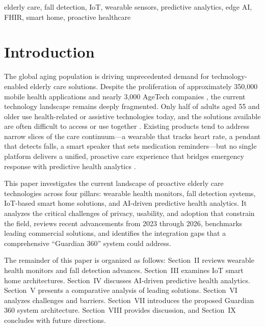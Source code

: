 \documentclass[conference]{IEEEtran}
\begin{document}
\begin{IEEEkeywords}
elderly care, fall detection, IoT, wearable sensors, predictive analytics, edge AI, FHIR, smart home, proactive healthcare
\end{IEEEkeywords}

\section{Introduction}

The global aging population is driving unprecedented demand for technology-enabled elderly care solutions. Despite the proliferation of approximately 350,000 mobile health applications and nearly 3,000 AgeTech companies \cite{milken2024}, the current technology landscape remains deeply fragmented. Only half of adults aged 55 and older use health-related or assistive technologies today, and the solutions available are often difficult to access or use together \cite{milken2024}. Existing products tend to address narrow slices of the care continuum---a wearable that tracks heart rate, a pendant that detects falls, a smart speaker that sets medication reminders---but no single platform delivers a unified, proactive care experience that bridges emergency response with predictive health analytics \cite{hfs2024}.

This paper investigates the current landscape of proactive elderly care technologies across four pillars: wearable health monitors, fall detection systems, IoT-based smart home solutions, and AI-driven predictive health analytics. It analyzes the critical challenges of privacy, usability, and adoption that constrain the field, reviews recent advancements from 2023 through 2026, benchmarks leading commercial solutions, and identifies the integration gaps that a comprehensive ``Guardian 360'' system could address.

The remainder of this paper is organized as follows: Section~II reviews wearable health monitors and fall detection advances. Section~III examines IoT smart home architectures. Section~IV discusses AI-driven predictive health analytics. Section~V presents a comparative analysis of leading solutions. Section~VI analyzes challenges and barriers. Section~VII introduces the proposed Guardian 360 system architecture. Section~VIII provides discussion, and Section~IX concludes with future directions.
\end{document}
